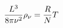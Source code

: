 \documentclass[preview]{standalone}
\begin{document}
\begin{align*}
{  L^3  \over  8\pi \nu^2  } \rho_{\nu}  =  \frac{R}{N}T
\end{align*}
\end{document}
